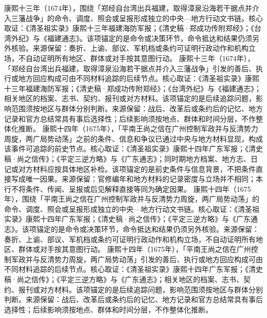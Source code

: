 康熙十三年（1674年），围绕「郑经自台湾出兵福建，取得漳泉沿海若干据点并介入三藩战争」的命令、调度、照会或呈报形成独立的中央—地方行动文书链。核心取证：《清圣祖实录》康熙十三年福建海防军报；《清史稿·郑成功传附郑经》；《台湾外纪》与《福建通志》。该项锚定的是命令或决策环节，命令抵达和结果仍须另外核验。来源保留：奏折、上谕、部议、军机档或条约可证明行政动作和机构立场，不自动证明所有地区、群体或对手按其意图行动。
康熙十三年（1674年），「郑经自台湾出兵福建，取得漳泉沿海若干据点并介入三藩战争」引发的善后、执行或地方回应构成可由不同材料追踪的后续节点。核心取证：《清圣祖实录》康熙十三年福建海防军报；《清史稿·郑成功传附郑经》；《台湾外纪》与《福建通志》；相关地区的档案、志书、契约、报刊或对方材料。该项锚定的是后续追踪问题，影响范围须按地区与群体分别判断。来源保留：战后、改革后或条约后的记忆、地方记录和官方总结常具有事后选择性；后续影响须按地点、群体和时间分层，不作整体化推断。
康熙十四年（1675年），「平南王尚之信在广州控制军政并与反清势力周旋，两广局势动荡」之前的条件、信息和争议已通过中央与地方材料显现，构成该事件可追踪的前史节点。核心取证：《清圣祖实录》康熙十四年广东军报；《清史稿·尚之信传》；《平定三逆方略》与《广东通志》；同时期地方档案、地方志、日记或对方材料应按具体地区补检。该项锚定的是前史条件与信息背景，不把条件直接写成唯一因果。来源保留：官修编年和地方材料的记录密度与立场并不相同；本行不将条件、传闻、呈报或后见解释直接等同为确定因果。
康熙十四年（1675年），围绕「平南王尚之信在广州控制军政并与反清势力周旋，两广局势动荡」的命令、调度、照会或呈报形成独立的中央—地方行动文书链。核心取证：《清圣祖实录》康熙十四年广东军报；《清史稿·尚之信传》；《平定三逆方略》与《广东通志》。该项锚定的是命令或决策环节，命令抵达和结果仍须另外核验。来源保留：奏折、上谕、部议、军机档或条约可证明行政动作和机构立场，不自动证明所有地区、群体或对手按其意图行动。
康熙十四年（1675年），「平南王尚之信在广州控制军政并与反清势力周旋，两广局势动荡」引发的善后、执行或地方回应构成可由不同材料追踪的后续节点。核心取证：《清圣祖实录》康熙十四年广东军报；《清史稿·尚之信传》；《平定三逆方略》与《广东通志》；相关地区的档案、志书、契约、报刊或对方材料。该项锚定的是后续追踪问题，影响范围须按地区与群体分别判断。来源保留：战后、改革后或条约后的记忆、地方记录和官方总结常具有事后选择性；后续影响须按地点、群体和时间分层，不作整体化推断。
